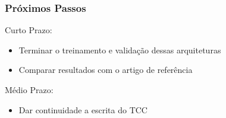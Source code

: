 \documentclass[aspectratio=169]{beamer}
\begin{document}
\begin{frame}
    \frametitle{Próximos Passos}

    \begin{block}{Curto Prazo:}

        \begin{itemize}
            \item Terminar o treinamento e validação dessas arquiteturas
            \item  Comparar resultados com o artigo de referência
        \end{itemize}

    \end{block}



    \begin{block}{Médio Prazo:}

        \begin{itemize}
            \item Dar continuidade a escrita do TCC
        \end{itemize}

    \end{block}




\end{frame}










\end{document}
